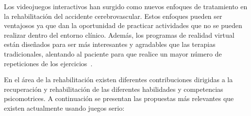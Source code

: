 Los videojuegos interactivos han surgido como nuevos enfoques de tratamiento en la rehabilitación del accidente cerebrovascular. Estos enfoques pueden ser ventajosos ya que dan la oportunidad de practicar actividades que no se pueden realizar dentro del entorno clínico. Además, los programas de realidad virtual están diseñados para ser más interesantes y agradables que las terapias tradicionales, alentando al paciente para que realice un mayor número de repeticiones de los ejercicios~\cite{laver2018virtual,alfageme2002aprendiendo}.

En el área de la rehabilitación existen diferentes contribuciones dirigidas a la recuperación y rehabilitación de las diferentes habilidades y competencias psicomotrices. A continuación se presentan las propuestas más relevantes que existen actualmente usando juegos serio:

